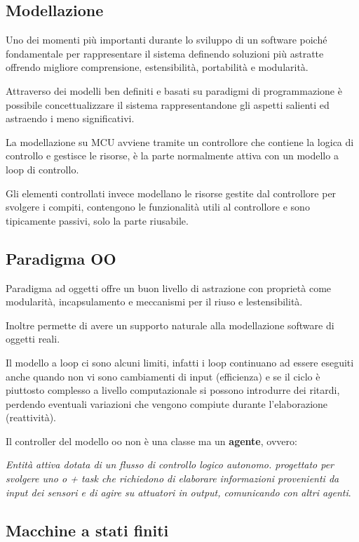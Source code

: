 \subsection{Modellazione}\label{modellazione}

Uno dei momenti più importanti durante lo sviluppo di un software poiché
fondamentale per rappresentare il sistema definendo soluzioni più
astratte offrendo migliore comprensione, estensibilità, portabilità e
modularità.

Attraverso dei modelli ben definiti e basati su paradigmi di
programmazione è possibile concettualizzare il sistema rappresentandone
gli aspetti salienti ed astraendo i meno significativi.

La modellazione su MCU avviene tramite un controllore che contiene la
logica di controllo e gestisce le risorse, è la parte normalmente attiva
con un modello a loop di controllo.

Gli elementi controllati invece modellano le risorse gestite dal
controllore per svolgere i compiti, contengono le funzionalità utili al
controllore e sono tipicamente passivi, solo la parte riusabile.

\subsection{Paradigma OO}\label{paradigma-oo}

Paradigma ad oggetti offre un buon livello di astrazione con proprietà
come modularità, incapsulamento e meccanismi per il riuso e
l\textquotesingle estensibilità.

Inoltre permette di avere un supporto naturale alla modellazione
software di oggetti reali.

Il modello a loop ci sono alcuni limiti, infatti i loop continuano ad
essere eseguiti anche quando non vi sono cambiamenti di input
(efficienza) e se il ciclo è piuttosto complesso a livello
computazionale si possono introdurre dei ritardi, perdendo eventuali
variazioni che vengono compiute durante l'elaborazione (reattività).

Il controller del modello oo non è una classe ma un \textbf{agente},
ovvero:

\emph{Entità attiva dotata di un flusso di controllo logico autonomo.
progettato per svolgere uno o + task che richiedono di elaborare
informazioni provenienti da input dei sensori e di agire su attuatori in
output, comunicando con altri agenti}.

\subsection{Macchine a stati finiti}\label{macchine-a-stati-finiti}

